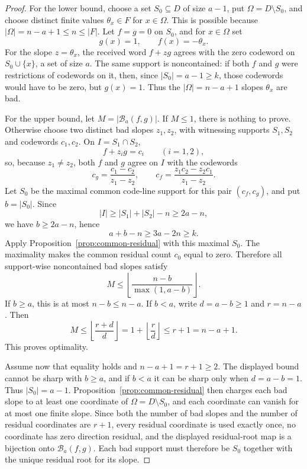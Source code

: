 \begin{proof}
For the lower bound, choose a set \(S_0\subseteq D\) of size \(a-1\), put
\(\Omega=D\setminus S_0\), and choose distinct finite values
\(\theta_x\in F\) for \(x\in\Omega\).  This is possible because
\(|\Omega|=n-a+1\le n\le |F|\).  Let \(f=g=0\) on \(S_0\), and for
\(x\in\Omega\) set
\[
  g(x)=1,
  \qquad
  f(x)=-\theta_x .
\]
For the slope \(z=\theta_x\), the received word \(f+zg\) agrees with the zero
codeword on \(S_0\cup\{x\}\), a set of size \(a\).  The same support is
noncontained: if both \(f\) and \(g\) were restrictions of codewords on it,
then, since \(|S_0|=a-1\ge k\), those codewords would have to be zero, but
\(g(x)=1\).  Thus the \(|\Omega|=n-a+1\) slopes \(\theta_x\) are bad.

For the upper bound, let \(M=|\mathcal B_a(f,g)|\).  If \(M\le1\), there is
nothing to prove.  Otherwise choose two distinct bad slopes \(z_1,z_2\), with
witnessing supports \(S_1,S_2\) and codewords \(c_1,c_2\).  On
\(I=S_1\cap S_2\),
\[
  f+z_i g=c_i\qquad (i=1,2),
\]
so, because \(z_1\ne z_2\), both \(f\) and \(g\) agree on \(I\) with the
codewords
\[
  c_g=\frac{c_1-c_2}{z_1-z_2},
  \qquad
  c_f=\frac{z_1c_2-z_2c_1}{z_1-z_2}.
\]
Let \(S_0\) be the maximal common code-line support for this pair
\((c_f,c_g)\), and put \(b=|S_0|\).  Since
\[
  |I|\ge |S_1|+|S_2|-n\ge2a-n,
\]
we have \(b\ge2a-n\), hence
\[
  a+b-n\ge3a-2n\ge k.
\]
Apply Proposition~\ref{prop:common-residual} with this maximal \(S_0\).  The
maximality makes the common residual count \(c_0\) equal to zero.  Therefore
all support-wise noncontained bad slopes satisfy
\[
  M\le
  \left\lfloor
    \frac{n-b}{\max(1,a-b)}
  \right\rfloor .
\]
If \(b\ge a\), this is at most \(n-b\le n-a\).  If \(b<a\), write
\(d=a-b\ge1\) and \(r=n-a\).  Then
\[
  M\le \left\lfloor\frac{r+d}{d}\right\rfloor
    =1+\left\lfloor\frac r d\right\rfloor
    \le r+1=n-a+1.
\]
This proves optimality.

Assume now that equality holds and \(n-a+1=r+1\ge2\).  The displayed bound
cannot be sharp with \(b\ge a\), and if \(b<a\) it can be sharp only when
\(d=a-b=1\).  Thus \(|S_0|=a-1\).  Proposition~\ref{prop:common-residual}
then charges each bad slope to at least one coordinate of
\(\Omega=D\setminus S_0\), and each coordinate can vanish for at most one
finite slope.  Since both the number of bad slopes and the number of residual
coordinates are \(r+1\), every residual coordinate is used exactly once, no
coordinate has zero direction residual, and the displayed residual-root map is
a bijection onto \(\mathcal B_a(f,g)\).  Each bad support must therefore be
\(S_0\) together with the unique residual root for its slope.
\end{proof}

